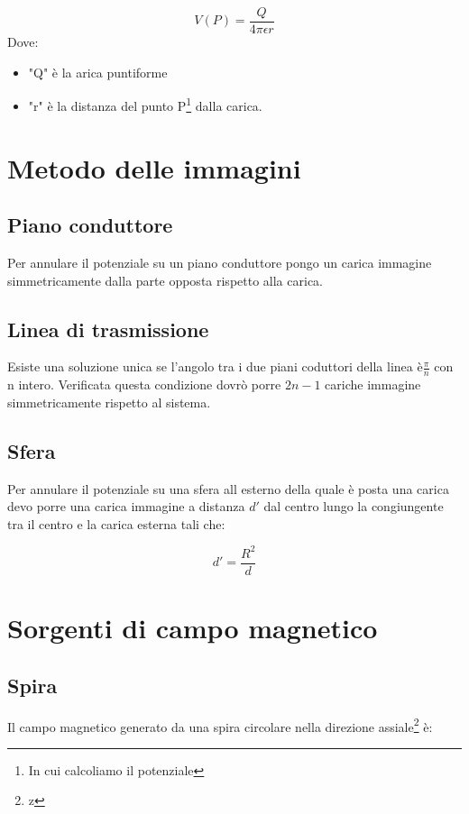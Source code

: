\documentclass[10pt,a4paper]{report}
\begin{document}
		\[
		V(P)=\frac{Q}{4\pi \epsilon r}
		\]
		Dove:
		\begin{itemize}
		\item "Q" è la arica puntiforme

		\item "r" è la distanza del punto P\footnote{In cui calcoliamo il potenziale} dalla carica.
		\end{itemize}

\chapter{Metodo delle immagini}	


\section{Piano conduttore}

Per annulare il potenziale su un piano conduttore pongo un carica immagine simmetricamente dalla parte opposta rispetto alla carica.

\section{Linea di trasmissione}

Esiste una soluzione unica se l'angolo tra i due piani coduttori della linea è$\frac{\pi}{n}$ con n intero.
Verificata questa condizione dovrò porre $2n-1$ cariche immagine simmetricamente rispetto al sistema.

\section{Sfera}

Per annulare il potenziale su una sfera all esterno della quale è posta una carica devo porre una carica immagine a distanza $d'$ dal centro lungo la congiungente tra il centro e la carica esterna tali che:

\[
d'=\frac{R^2}{d}
\]


\chapter{Sorgenti di campo magnetico}

	\section{Spira}
			Il campo magnetico generato da una spira circolare nella direzione assiale\footnote{z} è:
\end{document}
